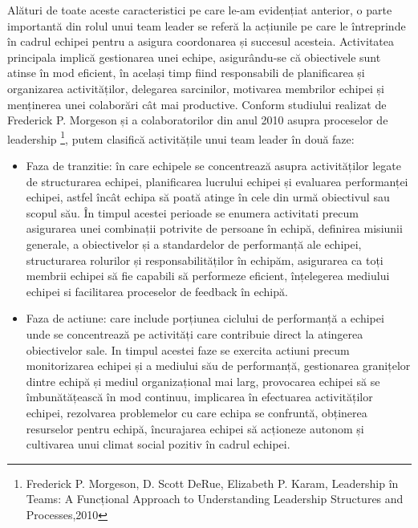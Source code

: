 \documentclass[a4paper, 12pt]{article}
\begin{document}
	\quad\space Alături de toate aceste caracteristici pe care le-am evidențiat anterior, o parte importantă din rolul unui team leader se referă la acțiunile pe care le întreprinde în cadrul echipei pentru a asigura coordonarea și succesul acesteia. Activitatea principala implică gestionarea unei echipe, asigurându-se că obiectivele sunt atinse în mod eficient, în același timp fiind responsabili de planificarea și organizarea activităților, delegarea sarcinilor, motivarea membrilor echipei și menținerea unei colaborări cât mai productive. Conform studiului realizat de Frederick P. Morgeson și a colaboratorilor din anul 2010 asupra proceselor de leadership \footnote{Frederick P. Morgeson, D. Scott DeRue, Elizabeth P. Karam, Leadership în Teams: A Funcțional Approach to Understanding Leadership Structures and Processes,2010}, putem clasifică activitățile unui team leader în două faze: 
	\begin{itemize}

	\item Faza de tranzitie: în care echipele se concentrează asupra activităților legate de structurarea echipei, planificarea lucrului echipei și evaluarea performanței echipei, astfel încât echipa să poată atinge în cele din urmă obiectivul sau scopul său. În timpul acestei perioade  se enumera activitati precum asigurarea unei combinații potrivite de persoane în echipă, definirea misiunii generale, a obiectivelor și a standardelor de performanță ale echipei, structurarea rolurilor și responsabilităților în echipăm, asigurarea ca toți membrii echipei să fie capabili să performeze eficient, înțelegerea mediului echipei si facilitarea proceselor de feedback în echipă. 

	\item Faza de actiune: care include porțiunea ciclului de performanță a echipei unde se concentrează pe activități care contribuie direct la atingerea obiectivelor sale. In timpul acestei faze se exercita actiuni precum monitorizarea echipei și a mediului său de performanță, gestionarea granițelor dintre echipă și mediul organizațional mai larg, provocarea echipei să se îmbunătățească în mod continuu, implicarea în efectuarea activităților echipei, rezolvarea problemelor cu care echipa se confruntă, obținerea resurselor pentru echipă, încurajarea echipei să acționeze autonom și cultivarea unui climat social pozitiv în cadrul echipei. 
	\end{itemize}

\quad\space 

\end{document}
